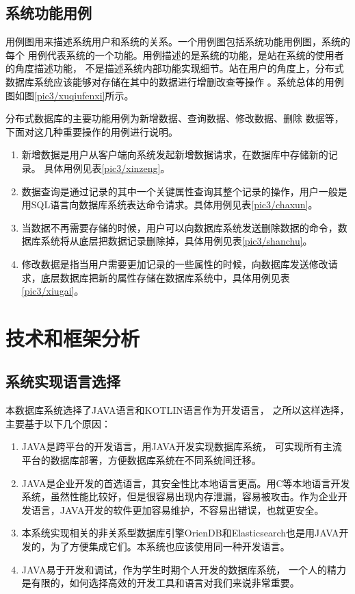 \subsection{系统功能用例}
用例图用来描述系统用户和系统的关系。一个用例图包括系统功能用例图，系统的每个
用例代表系统的一个功能。用例描述的是系统的功能，是站在系统的使用者的角度描述功能，
不是描述系统内部功能实现细节。站在用户的角度上，分布式数据库系统应该能够对存储在其中的数据进行增删改查等操作
。系统总体的用例图如图\ref{pic3/xuqiufenxi}所示。

分布式数据库的主要功能用例为新增数据、查询数据、修改数据、删除
数据等，下面对这几种重要操作的用例进行说明。
\begin{enumerate}[fullwidth,itemindent=2em,listparindent=2em]
	\item 新增数据是用户从客户端向系统发起新增数据请求，在数据库中存储新的记录。
	具体用例见表\ref{pic3/xinzeng}。
	\item 数据查询是通过记录的其中一个关键属性查询其整个记录的操作，用户一般是用SQL语言向数据库系统表达命令请求。具体用例见表\ref{pic3/chaxun}。
\item 当数据不再需要存储的时候，用户可以向数据库系统发送删除数据的命令，数据库系统将从底层把数据记录删除掉，具体用例见表\ref{pic3/shanchu}。
\item 	修改数据是指当用户需要更加记录的一些属性的时候，向数据库发送修改请求，底层数据库把新的属性存储在数据库系统中，具体用例见表\ref{pic3/xiugai}。
\end{enumerate}
\section{技术和框架分析}
\subsection{系统实现语言选择}
本数据库系统选择了JAVA语言和KOTLIN语言作为开发语言，
之所以这样选择，主要基于以下几个原因：
\begin{enumerate}[fullwidth,itemindent=2em,listparindent=2em]
	\item JAVA是跨平台的开发语言，用JAVA开发实现数据库系统，
	可实现所有主流平台的数据库部署，方便数据库系统在不同系统间迁移。
	\item JAVA是企业开发的首选语言，其安全性比本地语言更高。用C等本地语言开发系统，虽然性能比较好，但是很容易出现内存泄漏，容易被攻击。作为企业开发语言，JAVA开发的软件更加容易维护，不容易出错误，也就更安全。
	\item 本系统实现相关的非关系型数据库引擎OrienDB和Elasticsearch也是用JAVA开发的，为了方便集成它们。本系统也应该使用同一种开发语言。
	\item JAVA易于开发和调试，作为学生时期个人开发的数据库系统，
	一个人的精力是有限的，如何选择高效的开发工具和语言对我们来说非常重要。
\end{enumerate}

